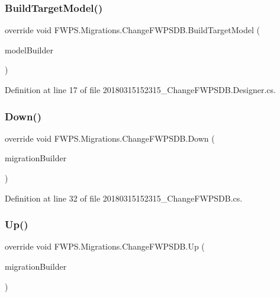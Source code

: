 \subsubsection{\texorpdfstring{Build\+Target\+Model()}{BuildTargetModel()}}
{\footnotesize\ttfamily override void F\+W\+P\+S.\+Migrations.\+Change\+F\+W\+P\+S\+D\+B.\+Build\+Target\+Model (\begin{DoxyParamCaption}\item[{Model\+Builder}]{model\+Builder }\end{DoxyParamCaption})\hspace{0.3cm}{\ttfamily [protected]}}



Definition at line 17 of file 20180315152315\+\_\+\+Change\+F\+W\+P\+S\+D\+B.\+Designer.\+cs.

\mbox{\label{class_f_w_p_s_1_1_migrations_1_1_change_f_w_p_s_d_b_a00d0bd3428a326d8c9fa56abb39c5268}} 
\subsubsection{\texorpdfstring{Down()}{Down()}}
{\footnotesize\ttfamily override void F\+W\+P\+S.\+Migrations.\+Change\+F\+W\+P\+S\+D\+B.\+Down (\begin{DoxyParamCaption}\item[{Migration\+Builder}]{migration\+Builder }\end{DoxyParamCaption})\hspace{0.3cm}{\ttfamily [protected]}}



Definition at line 32 of file 20180315152315\+\_\+\+Change\+F\+W\+P\+S\+D\+B.\+cs.

\mbox{\label{class_f_w_p_s_1_1_migrations_1_1_change_f_w_p_s_d_b_a55af5789cb4d9119801ccae1ec8adf37}} 
\subsubsection{\texorpdfstring{Up()}{Up()}}
{\footnotesize\ttfamily override void F\+W\+P\+S.\+Migrations.\+Change\+F\+W\+P\+S\+D\+B.\+Up (\begin{DoxyParamCaption}\item[{Migration\+Builder}]{migration\+Builder }\end{DoxyParamCaption})\hspace{0.3cm}{\ttfamily [protected]}}



